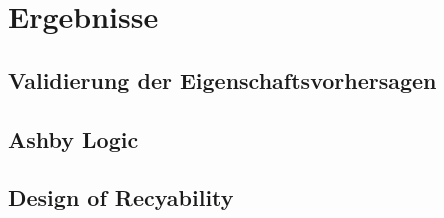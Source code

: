 \chapter{Ergebnisse}
\section{Validierung der Eigenschaftsvorhersagen}

\section{Ashby Logic}

\section{Design of Recyability}
